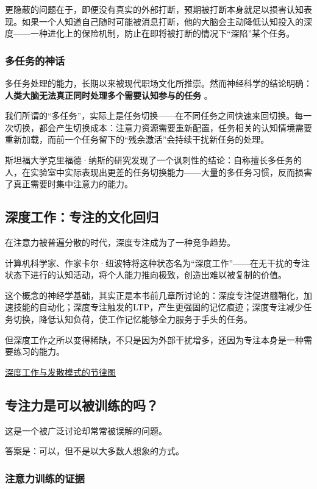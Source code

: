 \documentclass[11pt]{article}
\begin{document}
更隐蔽的问题在于，即便没有真实的外部打断，预期被打断本身就足以损害认知表现。如果一个人知道自己随时可能被消息打断，他的大脑会主动降低认知投入的深度——一种进化上的保险机制，防止在即将被打断的情况下“深陷”某个任务。
\subsubsection{多任务的神话}
\label{sec:orgcc638dc}

多任务处理的能力，长期以来被现代职场文化所推崇。然而神经科学的结论明确： \textbf{人类大脑无法真正同时处理多个需要认知参与的任务} 。

我们所谓的“多任务”，实际上是任务切换——在不同任务之间快速来回切换。每一次切换，都会产生切换成本：注意力资源需要重新配置，任务相关的认知情境需要重新加载，而前一个任务留下的“残余激活”会持续干扰新任务的处理。

斯坦福大学克里福德·纳斯的研究发现了一个讽刺性的结论：自称擅长多任务的人，在实验室中实际表现出更差的任务切换能力——大量的多任务习惯，反而损害了真正需要时集中注意力的能力。
\subsection{深度工作：专注的文化回归}
\label{sec:orgc596dec}

在注意力被普遍分散的时代，深度专注成为了一种竞争趋势。

计算机科学家、作家卡尔·纽波特将这种状态名为“深度工作”——在无干扰的专注状态下进行的认知活动，将个人能力推向极致，创造出难以被复制的价值。

这个概念的神经学基础，其实正是本书前几章所讨论的：深度专注促进髓鞘化，加速技能的自动化；深度专注触发的LTP，产生更强固的记忆痕迹；深度专注减少任务切换，降低认知负荷，使工作记忆能够全力服务于手头的任务。

但深度工作之所以变得稀缺，不只是因为外部干扰增多，还因为专注本身是一种需要练习的能力。

\href{file:///c:/Users/fupen/org/book/插图/深度工作与发散模式的节律图.png}{深度工作与发散模式的节律图}
\subsection{专注力是可以被训练的吗？}
\label{sec:org6278641}

这是一个被广泛讨论却常常被误解的问题。

答案是：可以，但不是以大多数人想象的方式。
\subsubsection{注意力训练的证据}
\label{sec:orgfc92131}
\end{document}
